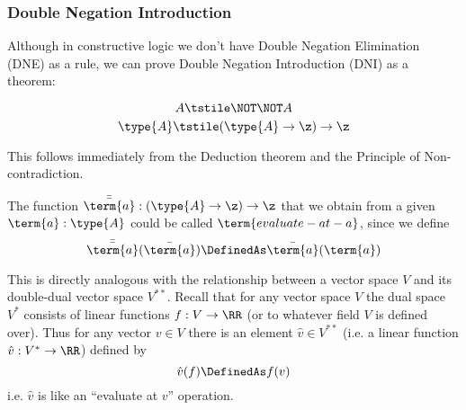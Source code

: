 \subsubsection{Double Negation Introduction}

Although in constructive logic we don't have Double Negation Elimination (DNE) as a rule, we can prove Double Negation Introduction (DNI) as a theorem:
\begin{Theorem}
\label{thm:DNI}
\[
A 
\tstile 
\NOT \NOT A
\]
\[
\type{A}
\tstile 
(\type{A} \to\z)\to\z
\]
\end{Theorem}
\begin{Proof}
This follows immediately from the Deduction theorem and the Principle of Non-contradiction.
\end{Proof}

The function $\bar{\bar{\term{a}}}:(\type{A} \to\z)\to\z$ that we obtain from a given $\term{a}:\type{A}$ could be called $\term{evaluate-at-a}$, since we define 
\[
\bar{\bar{\term{a}}}(\bar{\term{a}}) \DefinedAs
\bar{\term{a}}(\term{a})
\]


This is directly analogous with the relationship between a vector space $V$ and its double-dual vector space $V^{\ast\ast}$.  Recall that for any vector space $V$ the dual space $V^{\ast}$ consists of linear functions $f:V\to \RR$ (or to whatever field $V$ is defined over).  Thus for any vector $v \in V$ there is an element $\hat{v} \in V^{\ast\ast}$ (i.e. a linear function $\hat{v}: V^{\ast} \to \RR$) defined by
\[
\hat{v}(f) \DefinedAs f(v)
\]
i.e. $\hat{v}$ is like an ``evaluate at $v$'' operation.


